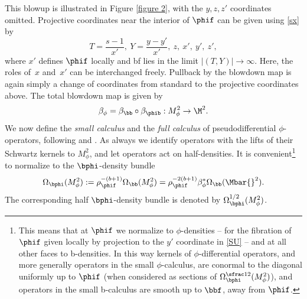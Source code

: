 This blowup is illustrated in Figure \ref{figure 2}, with the $y,z,z'$ coordinates omitted.
Projective coordinates near the interior of $\phif$ can be given using \eqref{sx} by
\begin{equation}\label{SU}
T = \frac{s-1}{x'}, \ Y = \frac{y-y'}{x'},\ z, \ x', \ y', \ z',
\end{equation}
where $x'$ defines $\phif$ locally
and bf lies in the limit $|(T,Y)| \to \infty$. Here, the roles of~$x$ and~$x'$ can be interchanged
freely. Pullback by the blowdown map is again simply
a change of coordinates from standard to \eg the projective coordinates above. The total blowdown map is given by
\begin{align*}
\beta_{\phi} = \beta_\bb\circ \beta_{\phib}
: M^{2}_{\phi} \to \M^{2}.
\end{align*}
We now define the \emph{small calculus} and the \emph{full calculus} of pseudodifferential $\phi$\nobreakdash-ope\-ra\-tors, following
\cite{mazzeo1998pseudodifferential} and \cite{grieser2009pseudodifferential}.
As always we identify operators with the lifts of their Schwartz kernels to $M^2_\phi$, and let operators act on half-densities.
It is convenient\footnote{This means that at $\phif$ we normalize to $\phi$-densities -- for the fibration of $\phif$ given locally by projection to the $y'$ coordinate in \eqref{SU} -- and at all other faces to b-densities. In this way kernels of $\phi$-differential operators, and more generally operators in the small $\phi$-calculus, are conormal to the diagonal
uniformly up to $\phif$ (when considered as sections of $\Omega_{\bphi}^{\sfrac12}(M^2_\phi)$), and operators in the small b-calculus are smooth up to $\bbf$, away from $\phif$.}
to normalize to the $\bphi$-density bundle
\begin{equation}
\label{eqn:densities M2phi}
\Omega_{\bphi}(M^2_\phi) := \rho_\phif^{-(b+1)}\Omega_\bb(M^2_\phi) =
\rho_\phif^{-2(b+1)}\beta_\phi^* \Omega_\bb(\Mbar{}^2).
\end{equation}
The corresponding half $\bphi$-density bundle is denoted by $\Omega^{1/2}_{\bphi}(M^2_\phi)$.

